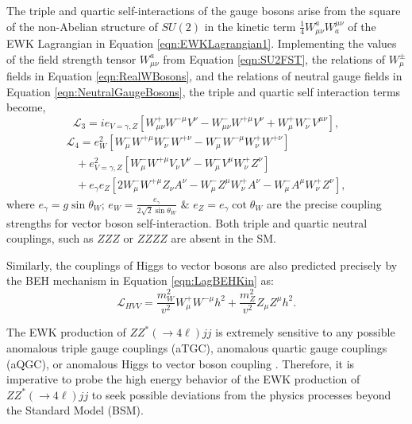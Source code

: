 The triple and quartic self-interactions of the gauge bosons arise from the square of the non-Abelian structure of $SU(2)$ in the kinetic term $ \frac{1}{4} W^{a}_{\mu\nu} W^{\mu\nu}_{a}$ of the EWK Lagrangian in Equation \ref{eqn:EWKLagrangian1}. Implementing the values of the field strength tensor $W^{a}_{\mu\nu}$ from Equation \ref{eqn:SU2FST}, the relations of $W_{\mu}^{\pm}$ fields in Equation \ref{eqn:RealWBosons}, and the relations of neutral gauge fields in Equation \ref{eqn:NeutralGaugeBosons}, the triple and quartic self interaction terms become, 
\begin{equation}
\mathcal{L}_{3} = ie_{V=\gamma,Z} [ W^{+}_{\mu\nu} W^{-\mu} V^{\nu} - W^{-}_{\mu\nu} W^{+\mu} V^{\nu} + W_{\mu}^{+}W_{\nu}^{-}V^{\mu\nu} ], 
\label{eqn:L_TGC}
\end{equation}
\begin{equation}
\begin{array}{l}
\mathcal{L}_{4} = e^{2}_{W} [ W^{-}_{\mu}W^{+\mu}W^{-}_{\nu}W^{+\nu} - W^{-}_{\mu}W^{-\mu}W^{+}_{\nu}W^{+\nu} ] \\
 \hspace{10pt} + e^2_{V=\gamma,Z} [ W^{-}_{\mu}W^{+\mu}V_{\nu}V^{\nu} - W^{-}_{\mu}V^{\mu}W^{+}_{\nu}Z^{\nu} ] \\
  \hspace{10pt} + e_{\gamma}e_{Z} [ 2W^{-}_{\mu} W^{+\mu} Z_{\nu}A^{\nu} - W_{\mu}^{-}Z^{\mu}W^{+}_{\nu}A^{\nu} - W_{\mu}^{-}A^{\mu}W^{+}_{\nu}Z^{\nu} ],
\end{array}
\label{eqn:L_QGC}
\end{equation}
where $e_{\gamma} = g\sin\theta_{W}$; $e_{W} = \frac{e_{\gamma}}{2\sqrt{2}\sin\theta_{W}}$ $\&$ $e_{Z} = e_{\gamma}\cot\theta_{W}$ are the precise coupling strengths for vector boson self-interaction. Both triple and quartic neutral couplings, such as $ZZZ$ or $ZZZZ$ are absent in the SM. 

Similarly, the couplings of Higgs to vector bosons are also predicted precisely by the BEH mechanism in Equation \ref{eqn:LagBEHKin} as:
\begin{equation}
\mathcal{L}_{HVV} = \frac{m_{W}^2}{v^2} W^{+}_{\mu}W^{-\mu}h^{2} + \frac{m_{Z}^{2}}{v^2} Z_{\mu}Z^{\mu}h^{2}.
\label{eqn:HVVCoupling}
\end{equation}

The EWK production of $ZZ^*(\rightarrow 4\ell ) jj$ is extremely sensitive to any possible anomalous triple gauge couplings (aTGC), anomalous quartic gauge couplings (aQGC), or anomalous Higgs to vector boson coupling \cite{SensitivityNP} \cite{EFT_Eboli} \cite{BSM_Simple2HDM}. Therefore, it is imperative to probe the high energy behavior of the EWK production of $ZZ^*(\rightarrow 4\ell ) jj$ to seek possible deviations from the physics processes beyond the Standard Model (BSM). 

